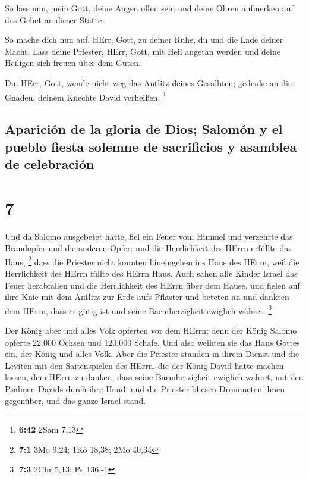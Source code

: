  So lass nun, mein Gott, deine Augen offen sein und deine
Ohren aufmerken auf das Gebet an dieser Stätte.

 So mache dich nun auf, HErr, Gott, zu deiner Ruhe, du
und die Lade deiner Macht. Lass deine Priester, HErr, Gott, mit Heil
angetan werden und deine Heiligen sich freuen über dem Guten.

 Du, HErr, Gott, wende nicht weg das Antlitz deines
Gesalbten; gedenke an die Gnaden, deinem Knechte David verheißen.
\footnote{\textbf{6:42} 2Sam 7,13}

\hypertarget{apariciuxf3n-de-la-gloria-de-dios-salomuxf3n-y-el-pueblo-fiesta-solemne-de-sacrificios-y-asamblea-de-celebraciuxf3n}{%
\subsection{Aparición de la gloria de Dios; Salomón y el pueblo fiesta
solemne de sacrificios y asamblea de
celebración}\label{apariciuxf3n-de-la-gloria-de-dios-salomuxf3n-y-el-pueblo-fiesta-solemne-de-sacrificios-y-asamblea-de-celebraciuxf3n}}

\hypertarget{section-6}{%
\section{7}\label{section-6}}

 Und da Salomo ausgebetet hatte, fiel ein Feuer vom Himmel
und verzehrte das Brandopfer und die anderen Opfer; und die Herrlichkeit
des HErrn erfüllte das Haus, \footnote{\textbf{7:1} 3Mo 9,24; 1Kö 18,38;
  2Mo 40,34}  dass die Priester nicht konnten hineingehen
ins Haus des HErrn, weil die Herrlichkeit des HErrn füllte des HErrn
Haus.  Auch sahen alle Kinder Israel das Feuer herabfallen
und die Herrlichkeit des HErrn über dem Hause, und fielen auf ihre Knie
mit dem Antlitz zur Erde aufs Pflaster und beteten an und dankten dem
HErrn, dass er gütig ist und seine Barmherzigkeit ewiglich währet.
\footnote{\textbf{7:3} 2Chr 5,13; Ps 136,-1}

 Der König aber und alles Volk opferten vor dem HErrn;
 denn der König Salomo opferte 22.000 Ochsen und 120.000
Schafe. Und also weihten sie das Haus Gottes ein, der König und alles
Volk.  Aber die Priester standen in ihrem Dienst und die
Leviten mit den Saitenspielen des HErrn, die der König David hatte
machen lassen, dem HErrn zu danken, dass seine Barmherzigkeit ewiglich
währet, mit den Psalmen Davids durch ihre Hand; und die Priester bliesen
Drommeten ihnen gegenüber, und das ganze Israel stand.

